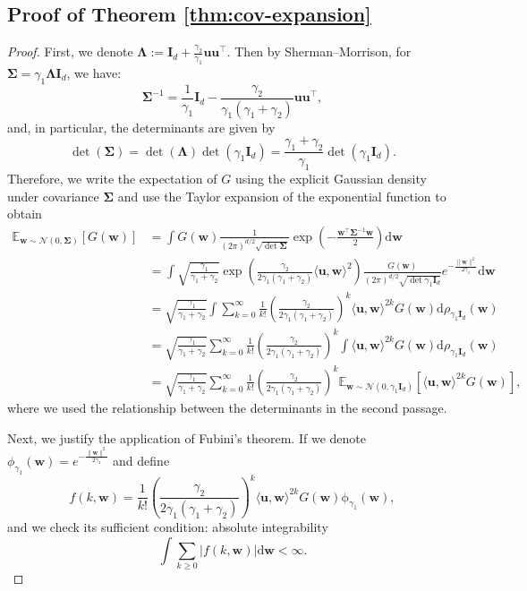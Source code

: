 \subsection{Proof of Theorem \ref{thm:cov-expansion}}\label{app:thm-cov-expansion}
\begin{proof}
    First, we denote $\bm \Lambda := \bm I_d + \frac{\gamma_2}{\gamma_1}\bm u \bm u^\top$. Then by Sherman–Morrison, for $\bm \Sigma = \gamma_1 \bm \Lambda \bm I_d$, we have:
    \[
        \bm \Sigma^{-1} = \frac{1}{\gamma_1}\bm I_d - \frac{\gamma_2}{\gamma_1(\gamma_1+\gamma_2)}\bm u \bm u^\top,
    \]
    and, in particular, the determinants are given by 
    \[
        \det(\bm \Sigma) = \det (\bm \Lambda) \det (\gamma_1 \bm I_d) = \frac{\gamma_1+\gamma_2}{\gamma_1}\det (\gamma_1 \bm I_d).
    \]
    Therefore, we write the expectation of $G$ using the explicit Gaussian density under covariance $\bm \Sigma$ and use the Taylor expansion of the exponential function to obtain
    \begin{align*}
        \mathbb E_{\bm w \sim \mathcal N(0, \bm \Sigma)}[G(\bm w)] &= \int G(\bm w)\frac{1}{(2\pi)^{d/2}\sqrt{\det{\bm \Sigma}}}\exp\left({-\frac{\bm w^\top \bm \Sigma^{-1}\bm w}{2}}\right)\mathrm d\bm w\\
        &=\int \sqrt{\frac{\gamma_1}{\gamma_1+\gamma_2}}\exp\left(\frac{\gamma_2}{2\gamma_1(\gamma_1+\gamma_2)}\langle \bm u, \bm w\rangle^2 \right)\frac{G(\bm w)}{(2\pi)^{d/2}\sqrt{\det \gamma_1\bm I_d}}e^{-\frac{\|\bm w\|^2}{2\gamma_1}}\mathrm d\bm w\\
        &=\sqrt{\frac{\gamma_1}{\gamma_1+\gamma_2}} \int \sum_{k=0}^\infty \frac{1}{k!}\left(\frac{\gamma_2}{2\gamma_1(\gamma_1+\gamma_2)}\right)^k \langle \bm u, \bm w\rangle^{2k} G(\bm w)\mathrm d\rho_{\gamma_1 \bm I_d}(\bm w)\\
        &=\sqrt{\frac{\gamma_1}{\gamma_1+\gamma_2}}\sum_{k=0}^\infty \frac{1}{k!}\left(\frac{\gamma_2}{2\gamma_1(\gamma_1+\gamma_2)}\right)^k\int \langle \bm u, \bm w\rangle^{2k} G(\bm w)\mathrm d\rho_{\gamma_1 \bm I_d}(\bm w)\\
        &= \sqrt{\frac{\gamma_1}{\gamma_1+\gamma_2}}\sum_{k=0}^\infty \frac{1}{k!}\left(\frac{\gamma_2}{2\gamma_1(\gamma_1+\gamma_2)}\right)^k \mathbb E_{\bm w \sim \mathcal N(0, \gamma_1\bm I_d)}[\langle \bm u, \bm w\rangle^{2k}G(\bm w)],
    \end{align*}
    where we used the relationship between the determinants in the second passage.
    
    Next, we justify the application of Fubini's theorem. If we denote $\phi_{\gamma_1}(\bm w) = e^{-\frac{\|\bm w\|^2}{2\gamma_1}}$ and define
    \[
        f(k, \bm w) = \frac{1}{k!}\left(\frac{\gamma_2}{2\gamma_1(\gamma_1+\gamma_2)}\right)^k \langle \bm u, \bm w\rangle^{2k} G(\bm w)\mathrm \phi_{\gamma_1}(\bm w),
    \]
    and we check its sufficient condition: absolute integrability
    \[
        \int \sum_{k \geq 0} |f(k, \bm w)| \mathrm d \bm w < \infty.
    \]


\end{proof}
